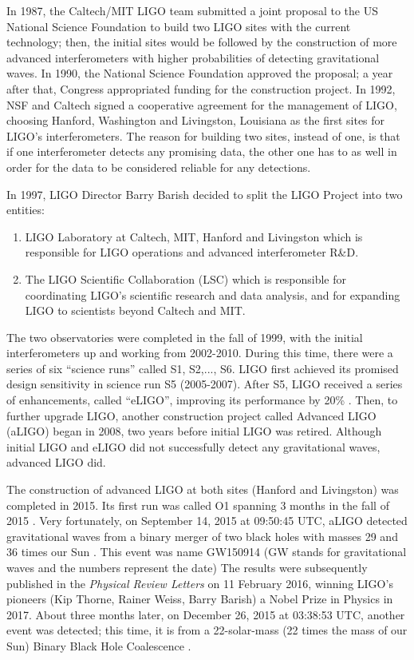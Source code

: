 \documentclass[preprint,
letterpaper,
 amsmath,amssymb,
 aps,
]{revtex4-2}
\begin{document}
In 1987, the Caltech/MIT LIGO team submitted a joint proposal to the US National Science Foundation to build two LIGO sites with the current technology; then, the initial sites would be followed by the construction of more advanced interferometers with higher probabilities of detecting gravitational waves. In 1990, the National Science Foundation approved the proposal; a year after that, Congress appropriated funding for the construction project. In 1992, NSF and Caltech signed a cooperative agreement for the management of LIGO, choosing Hanford, Washington and Livingston, Louisiana as the first sites for LIGO’s interferometers. The reason for building two sites, instead of one, is that if one interferometer detects any promising data, the other one has to as well in order for the data to be considered reliable for any detections.


In 1997, LIGO Director Barry Barish decided to split the LIGO Project into two entities:

\begin{enumerate}[nolistsep]
\item LIGO Laboratory at Caltech,
MIT, Hanford and Livingston which is responsible for LIGO operations and advanced interferometer
R\&D.
\item The LIGO Scientific Collaboration (LSC) which is responsible for coordinating LIGO's  scientific research and data analysis, and for expanding LIGO to scientists beyond Caltech and MIT.
\end{enumerate} 

The two observatories were completed in the fall of 1999, with the initial interferometers up and working from 2002-2010. During this time, there were a series of six ``science runs'' called S1, S2,..., S6. LIGO first achieved its promised design sensitivity in science run S5 (2005-2007). After S5, LIGO received a series of enhancements, called ``eLIGO'', improving its performance by 20\% \cite{jstortechnical}. Then, to further upgrade LIGO, another construction project called Advanced LIGO (aLIGO) began in 2008, two years before initial LIGO was retired. Although initial LIGO and eLIGO did not successfully detect any gravitational waves, advanced LIGO did.


The construction of advanced LIGO at both sites (Hanford and Livingston) was completed in 2015. Its first run was  called O1 spanning 3 months in the fall of 2015 \cite{jstortechnical}. Very fortunately, on September 14, 2015 at 09:50:45 UTC, aLIGO detected gravitational waves from a binary merger of two black holes with masses 29 and 36 times our Sun \cite{abbott}. This event was name GW150914 (GW stands for gravitational waves and the numbers represent the date) The results were subsequently published in the \textit{Physical Review Letters} on 11 February 2016, winning LIGO's pioneers (Kip Thorne, Rainer Weiss, Barry Barish) a Nobel Prize in Physics in 2017. About three months later, on December 26, 2015 at 03:38:53 UTC, another event was detected; this time, it is from a 22-solar-mass (22 times the mass of our Sun) Binary Black Hole Coalescence \cite{GW151226}.
\end{document}
